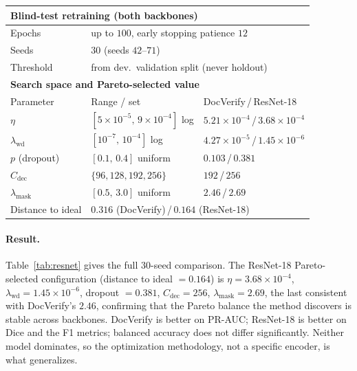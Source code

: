 \documentclass[11pt]{article}
\begin{document}
\begin{table}[h]
\begin{tabular}{lll}
    \midrule
    \multicolumn{3}{l}{\textbf{Blind-test retraining (both backbones)}} \\
    \midrule
    Epochs           & \multicolumn{2}{l}{up to $100$, early stopping patience $12$} \\
    Seeds            & \multicolumn{2}{l}{$30$ (seeds $42$--$71$)} \\
    Threshold        & \multicolumn{2}{l}{from dev.\ validation split (never holdout)} \\
    \midrule
    \multicolumn{3}{l}{\textbf{Search space and Pareto-selected value}} \\
    \midrule
    Parameter & Range / set & DocVerify\,/\,ResNet-18 \\
    \midrule
    $\eta$            & $[5{\times}10^{-5},\,9{\times}10^{-4}]$ log & $5.21{\times}10^{-4}$\,/\,$3.68{\times}10^{-4}$ \\
    $\lambda_{\text{wd}}$ & $[10^{-7},\,10^{-4}]$ log & $4.27{\times}10^{-5}$\,/\,$1.45{\times}10^{-6}$ \\
    $p$ (dropout)    & $[0.1,\,0.4]$ uniform & $0.103$\,/\,$0.381$ \\
    $C_{\text{dec}}$ & $\{96,128,192,256\}$ & $192$\,/\,$256$ \\
    $\lambda_{\text{mask}}$ & $[0.5,\,3.0]$ uniform & $2.46$\,/\,$2.69$ \\
    \midrule
    Distance to ideal & \multicolumn{2}{l}{$0.316$ (DocVerify)\,/\,$0.164$ (ResNet-18)} \\
    \bottomrule
  \end{tabular}
\end{table}

\paragraph{Result.} Table~\ref{tab:resnet} gives the full 30-seed comparison.
The ResNet-18 Pareto-selected configuration (distance to ideal $=0.164$) is
$\eta=3.68\times10^{-4}$, $\lambda_{\text{wd}}=1.45\times10^{-6}$, dropout
$=0.381$, $C_{\text{dec}}=256$, $\lambda_{\text{mask}}=2.69$, the last consistent
with DocVerify's $2.46$, confirming that the Pareto balance the method discovers
is stable across backbones. DocVerify is better on PR-AUC; ResNet-18 is better on
Dice and the F1 metrics; balanced accuracy does not differ significantly. Neither
model dominates, so the optimization methodology, not a specific encoder, is what
generalizes.
\end{document}
